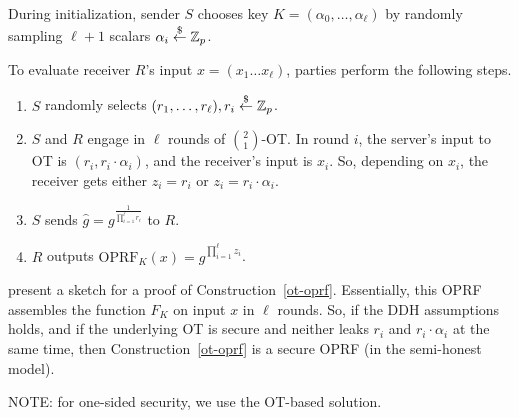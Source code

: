 \begin{construction}
\label{ot-oprf}
  During initialization, sender $S$ chooses key
  $K=(\alpha_0,\ldots,\alpha_\ell)$ by randomly sampling $\ell+1$
  scalars $\alpha_i\stackrel{\$}{\leftarrow}\mathbb{Z}_p$.

  To evaluate receiver $R$'s input $x=(x_1\ldots{}x_\ell)$, parties perform the following steps.
  \begin{enumerate}
  \item $S$ randomly selects $(r_1,\ldots,r_\ell),r_i\stackrel{\$}{\leftarrow}\mathbb{Z}_p$.
  \item $S$ and $R$ engage in $\ell$ rounds of $\binom{2}{1}$-OT. In round
    $i$, the server's input to OT is $(r_i,r_i\cdot\alpha_i)$, and the
    receiver's input is $x_i$. So, depending on $x_i$, the receiver gets either $z_i=r_i$ or $z_i=r_i\cdot{}\alpha_i$.
  \item $S$ sends $\hat{g}=g^{\frac{1}{\prod_{i=1}^{\ell}r_i}}$ to $R$.
    \item $R$ outputs $\text{OPRF}_K(x)=\hat{g}^{\prod^{\ell}_{i=1}z_i}$.
    
    \end{enumerate}
\end{construction}

\citet{oprf} present a sketch for a proof of
Construction~\ref{ot-oprf}. Essentially, this OPRF assembles the
\citeauthor{prf} function $F_K$ on input $x$ in $\ell$ rounds.  So, if
the DDH assumptions holds, and if the underlying OT is secure and
neither leaks $r_i$ and $r_i\cdot\alpha_i$ at the same time, then
Construction~\ref{ot-oprf} is a secure OPRF (in the semi-honest
model).

NOTE: for one-sided security, we use the OT-based solution.


